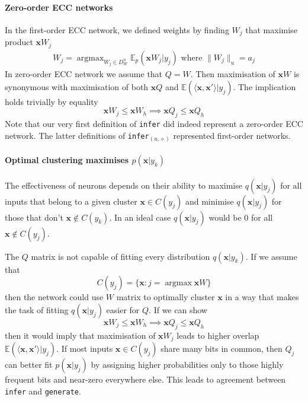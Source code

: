\documentclass[12pt]{article}
\DeclareMathOperator*{\argmax}{argmax}
\begin{document}
\paragraph{Zero-order ECC networks}
In the first-order ECC network, we defined weights by finding $W_j$ that maximise product $\boldsymbol{x}W_j$
\begin{gather*}
	W_j = \argmax_{W_j\in D_W^{n}} \mathbb{E}_p(\boldsymbol{x}W_j|y_j)\text{ where } \lVert W_j \rVert_u=a_j
\end{gather*}
In zero-order ECC network we assume that $Q=W$. Then maximisation of $\boldsymbol{x}W$ is synonymous with maximisation of both $\boldsymbol{x}Q$ and $\mathbb{E}(\langle \boldsymbol{x}, \boldsymbol{x}'\rangle|y_j) $. 
The implication holds trivially by equality
\[
\boldsymbol{x}W_j \le \boldsymbol{x}W_h  \implies  \boldsymbol{x}Q_j \le \boldsymbol{x}Q_h 
\]
Note that our very first definition of \texttt{infer} did indeed represent a zero-order ECC network. The latter definitions of \texttt{infer}$_{(u,\diamond)}$ represented first-order networks.

\paragraph{Optimal clustering maximises $p(\boldsymbol{x}|y_k)$} 
The effectiveness of neurons depends on their ability to maximise $q(\boldsymbol{x}|y_j)$ for all inputs that belong to a given cluster $\boldsymbol{x}\in C(y_j)$ and minimise $q(\boldsymbol{x}|y_j)$ for those that don't  $\boldsymbol{x}\notin C(y_k)$. In an ideal case $q(\boldsymbol{x}|y_j)$ would be $0$ for all $\boldsymbol{x}\notin C(y_j)$. 

The $Q$ matrix is not capable of fitting every distribution $q(\boldsymbol{x}|y_k)$.
If we assume that
\[
C(y_j) = \{\boldsymbol{x}:j=\argmax \boldsymbol{x}W\}
\]
then the network could use $W$ matrix to optimally cluster $\boldsymbol{x}$ in a way that makes the task of fitting $q(\boldsymbol{x}|y_j)$ easier for $Q$. If we can show
\[
\boldsymbol{x}W_j \le \boldsymbol{x}W_h  \implies  \boldsymbol{x}Q_j \le \boldsymbol{x}Q_h 
\]
then it would imply that maximisation of $\boldsymbol{x}W_j$ leads to higher overlap
$\mathbb{E}(\langle \boldsymbol{x}, \boldsymbol{x}'\rangle|y_j) $. If most inputs $\boldsymbol{x}\in C(y_j)$ share many bits in common, then $Q_j$ can better fit $p(\boldsymbol{x}|y_j)$ by assigning higher probabilities only to those highly frequent bits and near-zero everywhere else. This leads to agreement between \texttt{infer} and \texttt{generate}. 
\end{document}
